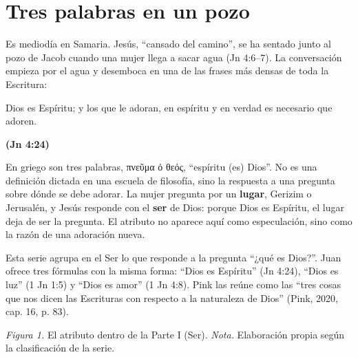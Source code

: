 \documentclass[11pt,letterpaper]{article}
\newcommand{\grc}[1]{\foreignlanguage{ancientgreek}{#1}}
\newcommand{\fuente}[1]{\par\hfill{\upshape\bfseries\small\textcolor{azul}{#1}}}
\newcommand{\destacar}[1]{\textbf{\textcolor{azul}{#1}}}
\begin{document}
\section{Tres palabras en un pozo}

Es mediodía en Samaria. Jesús, ``cansado del camino'', se ha sentado junto al pozo de Jacob cuando una mujer llega a sacar agua (Jn 4:6--7). La conversación empieza por el agua y desemboca en una de las frases más densas de toda la Escritura:

\begin{cita}Dios es Espíritu; y los que le adoran, en espíritu y en verdad es necesario que adoren.\fuente{(Jn 4:24)}\end{cita}

En griego son tres palabras, \grc{πνεῦμα ὁ θεός}, ``espíritu (es) Dios''. No es una definición dictada en una escuela de filosofía, sino la respuesta a una pregunta sobre dónde se debe adorar. La mujer pregunta por un \destacar{lugar}, Gerizim o Jerusalén, y Jesús responde con el \destacar{ser} de Dios: porque Dios es Espíritu, el lugar deja de ser la pregunta. El atributo no aparece aquí como especulación, sino como la razón de una adoración nueva.

Esta serie agrupa en el Ser lo que responde a la pregunta ``¿qué es Dios?''. Juan ofrece tres fórmulas con la misma forma: ``Dios es Espíritu'' (Jn 4:24), ``Dios es luz'' (1 Jn 1:5) y ``Dios es amor'' (1 Jn 4:8). Pink las reúne como las ``tres cosas que nos dicen las Escrituras con respecto a la naturaleza de Dios'' (Pink, 2020, cap. 16, p. 83).

\begin{center}
\par
{\footnotesize\color{gris}\textit{Figura 1.} El atributo dentro de la Parte I (Ser). \textit{Nota.} Elaboración propia según la clasificación de la serie.}
\end{center}
\end{document}
